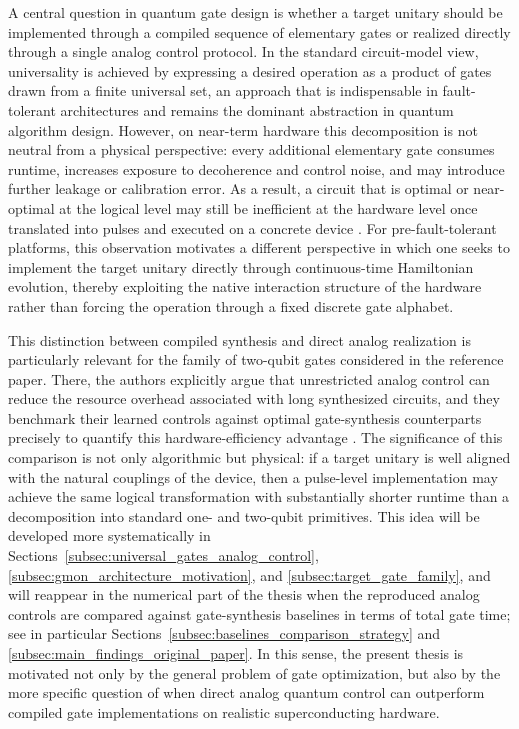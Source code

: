 A central question in quantum gate design is whether a target unitary should be implemented through a compiled sequence of elementary gates or realized directly through a single analog control protocol. In the standard circuit-model view, universality is achieved by expressing a desired operation as a product of gates drawn from a finite universal set, an approach that is indispensable in fault-tolerant architectures and remains the dominant abstraction in quantum algorithm design. However, on near-term hardware this decomposition is not neutral from a physical perspective: every additional elementary gate consumes runtime, increases exposure to decoherence and control noise, and may introduce further leakage or calibration error. As a result, a circuit that is optimal or near-optimal at the logical level may still be inefficient at the hardware level once translated into pulses and executed on a concrete device \cite{Niu2019,NielsenChuang2010,Koch2022}. For pre-fault-tolerant platforms, this observation motivates a different perspective in which one seeks to implement the target unitary directly through continuous-time Hamiltonian evolution, thereby exploiting the native interaction structure of the hardware rather than forcing the operation through a fixed discrete gate alphabet.

This distinction between compiled synthesis and direct analog realization is particularly relevant for the family of two-qubit gates considered in the reference paper. There, the authors explicitly argue that unrestricted analog control can reduce the resource overhead associated with long synthesized circuits, and they benchmark their learned controls against optimal gate-synthesis counterparts precisely to quantify this hardware-efficiency advantage \cite{Niu2019}. The significance of this comparison is not only algorithmic but physical: if a target unitary is well aligned with the natural couplings of the device, then a pulse-level implementation may achieve the same logical transformation with substantially shorter runtime than a decomposition into standard one- and two-qubit primitives. This idea will be developed more systematically in Sections~\ref{subsec:universal_gates_analog_control}, \ref{subsec:gmon_architecture_motivation}, and \ref{subsec:target_gate_family}, and will reappear in the numerical part of the thesis when the reproduced analog controls are compared against gate-synthesis baselines in terms of total gate time; see in particular Sections~\ref{subsec:baselines_comparison_strategy} and \ref{subsec:main_findings_original_paper}. In this sense, the present thesis is motivated not only by the general problem of gate optimization, but also by the more specific question of when direct analog quantum control can outperform compiled gate implementations on realistic superconducting hardware.


